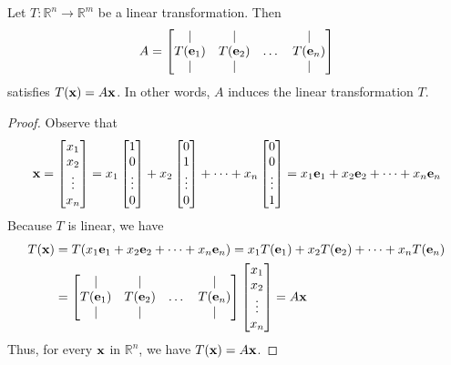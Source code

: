 \documentclass{ximera}
\renewcommand{\vec}[1]{{\bf #1}}
\newcommand{\RR}{\mathbb{R}}
\begin{document}
  \begin{theorem}\label{th:matlin} Let $T:\RR^n\rightarrow\RR^m$ be a linear transformation.  Then 
  \begin{equation*} \label{matlintrans}
 A=\begin{bmatrix}
           | & |& &|\\
		T(\vec{e}_1) & T(\vec{e}_2)&\dots &T(\vec{e}_n)\\
		|&| & &|
         \end{bmatrix}
\end{equation*}
satisfies $T(\vec{x})=A\vec{x}$.  In other words, $A$ induces the linear transformation $T$.
\end{theorem}


\begin{proof}  Observe that
\begin{align*}\vec{x}=\begin{bmatrix}x_1\\x_2\\\vdots\\x_n\end{bmatrix}=x_1\begin{bmatrix}1\\0\\\vdots\\0\end{bmatrix}+x_2\begin{bmatrix}0\\1\\\vdots\\0\end{bmatrix}+\dots+x_n\begin{bmatrix}0\\0\\\vdots\\1\end{bmatrix}=x_1\vec{e}_1+x_2\vec{e}_2+\dots+x_n\vec{e}_n
\end{align*}
Because $T$ is linear, we have
\begin{align*}
T(\vec{x})&=T(x_1\vec{e}_1+x_2\vec{e}_2+\dots+x_n\vec{e}_n)=x_1T(\vec{e}_1)+x_2T(\vec{e}_2)+\dots+x_nT(\vec{e}_n)\\
&=\begin{bmatrix}
           | & |& &|\\
		T(\vec{e}_1) & T(\vec{e}_2)&\dots &T(\vec{e}_n)\\
		|&| & &|
         \end{bmatrix}\begin{bmatrix}x_1\\x_2\\\vdots\\x_n\end{bmatrix}=A\vec{x}
\end{align*}
Thus, for every $\vec{x}$ in $\RR^n$, we have $T(\vec{x})=A\vec{x}$. 
\end{proof}
\end{document}
